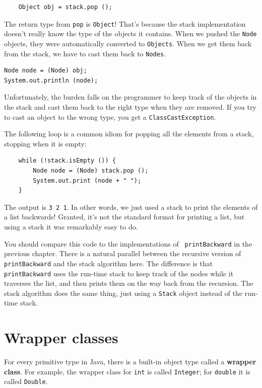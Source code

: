 \documentclass[12pt]{book}
\theoremstyle{exercise}
\begin{document}
\begin{verbatim}
    Object obj = stack.pop ();
\end{verbatim}
%
The return type from {\tt pop} is {\tt Object}!  That's because the
stack implementation doesn't really know the type of the objects it
contains.  When we pushed the {\tt Node} objects, they were automatically
converted to {\tt Objects}.  When we get them back from the stack,
we have to cast them back to {\tt Nodes}.

\begin{verbatim}
Node node = (Node) obj;
System.out.println (node);
\end{verbatim}
%
Unfortunately, the burden falls on the programmer to keep track of the
objects in the stack and cast them back to the right type when they
are removed.  If you try to cast an object to the wrong type, you get
a {\tt ClassCastException}.

The following loop is a common idiom for popping all the elements
from a stack, stopping when it is empty:

\begin{verbatim}
    while (!stack.isEmpty ()) {
        Node node = (Node) stack.pop ();
        System.out.print (node + " ");
    }

\end{verbatim}
%
The output is {\tt 3 2 1}.  In other words, we just used a stack
to print the elements of a list backwards!  Granted, it's not the
standard format for printing a list, but using a stack it was
remarkably easy to do.

You should compare this code to the implementations of {\tt
printBackward} in the previous chapter.  There is a natural parallel
between the recursive version of {\tt printBackward} and the stack
algorithm here.  The difference is that {\tt printBackward} uses the
run-time stack to keep track of the nodes while it traverses the list,
and then prints them on the way back from the recursion.  The stack
algorithm does the same thing, just using a {\tt Stack} object instead
of the run-time stack.


\section {Wrapper classes}

For every primitive type in Java, there is a built-in object type
called a {\bf wrapper class}.  For example, the wrapper class for
{\tt int} is called {\tt Integer}; for {\tt double} it is called
{\tt Double}.
\end{document}
